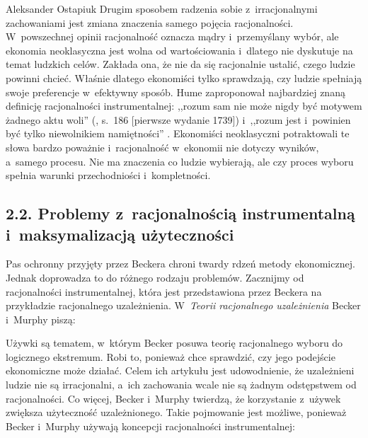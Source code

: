 \begin{artplenv}{Aleksander Ostapiuk}
Drugim sposobem radzenia sobie z~irracjonalnymi zachowaniami jest zmiana znaczenia samego pojęcia racjonalności.
W~powszechnej opinii racjonalność oznacza mądry i~przemyślany wybór, ale ekonomia neoklasyczna jest wolna od
wartościowania i~dlatego nie dyskutuje na temat ludzkich celów. Zakłada ona, że nie da się racjonalnie ustalić, czego
ludzie powinni chcieć. Właśnie dlatego ekonomiści tylko sprawdzają, czy ludzie spełniają swoje preferencje w~efektywny
sposób. Hume zaproponował najbardziej znaną definicję racjonalności instrumentalnej: ,,rozum sam nie może nigdy być
motywem żadnego aktu woli''
(\cite{hume_traktat_1963}, s.~186 [pierwsze wydanie 1739])
i~,,rozum
jest i~powinien być tylko niewolnikiem namiętności''
\parencite[s.~188]{hume_traktat_1963}.
Ekonomiści neoklasyczni
potraktowali te słowa bardzo poważnie i~racjonalność w~ekonomii nie dotyczy wyników, a~samego procesu. Nie ma znaczenia
co ludzie wybierają, ale czy proces wyboru spełnia warunki przechodniości i~kompletności. 

\subsection{2.2. Problemy z~racjonalnością instrumentalną i~maksymalizacją użyteczności}
Pas ochronny przyjęty przez Beckera chroni twardy rdzeń metody ekonomicznej. Jednak doprowadza to do różnego rodzaju
problemów. Zacznijmy od racjonalności instrumentalnej, która jest przedstawiona przez Beckera na przykładzie
racjonalnego uzależnienia. W~\textit{Teorii racjonalnego uzależnienia} Becker i~Murphy piszą: 


Używki są tematem, w~którym Becker posuwa teorię racjonalnego wyboru do logicznego ekstremum. Robi to, ponieważ chce
sprawdzić, czy jego podejście ekonomiczne może działać. Celem ich artykułu jest udowodnienie, że uzależnieni ludzie nie
są irracjonalni, a~ich zachowania wcale nie są żadnym odstępstwem od racjonalności. Co więcej, Becker i~Murphy
twierdzą, że korzystanie z~używek zwiększa użyteczność uzależnionego. Takie pojmowanie jest możliwe, ponieważ
Becker i~Murphy używają koncepcji racjonalności instrumentalnej: 


\end{artplenv}
